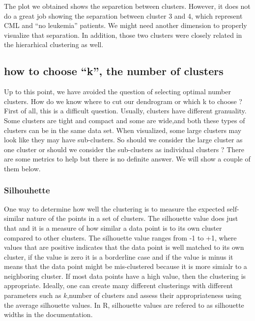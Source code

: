 \documentclass[12pt,]{krantz}
\theoremstyle{definition}
\theoremstyle{definition}
\theoremstyle{definition}
\theoremstyle{remark}
\begin{document}
The plot we obtained shows the separetion between clusters. However, it
does not do a great job showing the separation between cluster 3 and 4,
which represent CML and ``no leukemia'' patients. We might need another
dimension to properly visualize that separation. In addition, those two
clusters were closely related in the hierarhical clustering as well.

\hypertarget{how-to-choose-k-the-number-of-clusters}{%
\subsection{how to choose ``k'', the number of
clusters}\label{how-to-choose-k-the-number-of-clusters}}

Up to this point, we have avoided the question of selecting optimal
number clusters. How do we know where to cut our dendrogram or which k
to choose ? First of all, this is a difficult question. Usually,
clusters have different granuality. Some clusters are tight and compact
and some are wide,and both these types of clusters can be in the same
data set. When visualized, some large clusters may look like they may
have sub-clusters. So should we consider the large cluster as one
cluster or should we consider the sub-clusters as individual clusters ?
There are some metrics to help but there is no definite answer. We will
show a couple of them below.

\hypertarget{silhouhette}{%
\subsubsection{Silhouhette}\label{silhouhette}}

One way to determine how well the clustering is to measure the expected
self-similar nature of the points in a set of clusters. The silhouette
value does just that and it is a measure of how similar a data point is
to its own cluster compared to other clusters. The silhouette value
ranges from -1 to +1, where values that are positive indicates that the
data point is well matched to its own cluster, if the value is zero it
is a borderline case and if the value is minus it means that the data
point might be mis-clustered because it is more simialr to a neighboring
cluster. If most data points have a high value, then the clustering is
appropriate. Ideally, one can create many different clusterings with
different parameters such as \(k\),number of clusters and assess their
appropriateness using the average silhouette values. In R, silhouette
values are refered to as silhouette widths in the documentation.
\end{document}
